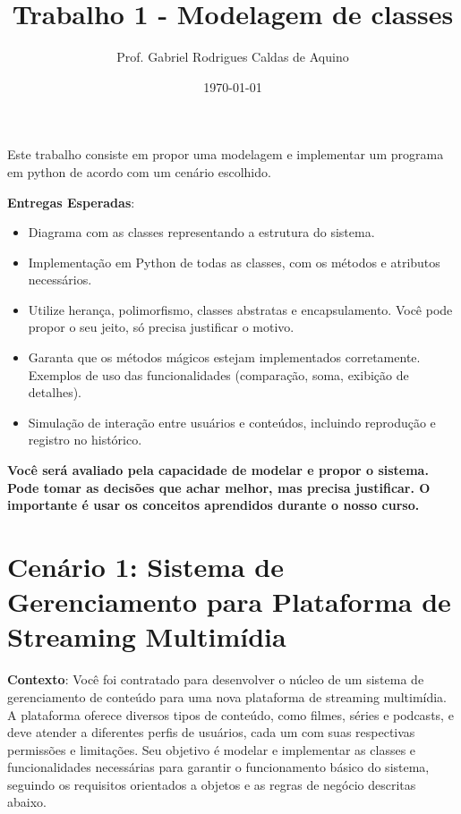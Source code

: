 \title{Trabalho 1 - Modelagem de classes}
\author{Prof. Gabriel Rodrigues Caldas de Aquino}
\date{\today}



\maketitle

Este trabalho consiste em propor uma modelagem e implementar um programa em python de acordo com um cenário escolhido.



    


\textbf{Entregas Esperadas}:


\begin{itemize}

    \item  Diagrama com as classes representando a estrutura do sistema.

    \item  Implementação em Python de todas as classes, com os métodos e atributos necessários.

       \item  Utilize herança, polimorfismo, classes abstratas e encapsulamento. Você pode propor o seu jeito, só precisa justificar o motivo.

       \item  Garanta que os métodos mágicos estejam implementados corretamente. Exemplos de uso das funcionalidades (comparação, soma, exibição de detalhes).

     \item Simulação de interação entre usuários e conteúdos, incluindo reprodução e registro no histórico.
   
\end{itemize}

\textbf{Você será avaliado pela capacidade de modelar e propor o sistema. Pode tomar as decisões que achar melhor, mas precisa justificar. O importante é usar os conceitos aprendidos durante o nosso curso.}

\section{Cenário 1: Sistema de Gerenciamento para Plataforma de Streaming Multimídia}

\textbf{Contexto}:
 Você foi contratado para desenvolver o núcleo de um sistema de gerenciamento de conteúdo para uma nova plataforma de streaming multimídia. A plataforma oferece diversos tipos de conteúdo, como filmes, séries e podcasts, e deve atender a diferentes perfis de usuários, cada um com suas respectivas permissões e limitações. Seu objetivo é modelar e implementar as classes e funcionalidades necessárias para garantir o funcionamento básico do sistema, seguindo os requisitos orientados a objetos e as regras de negócio descritas abaixo.

